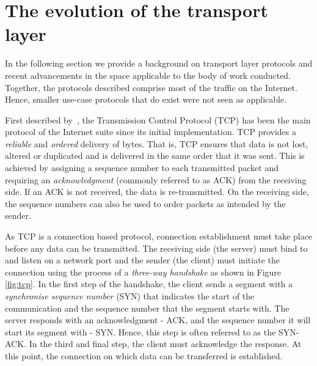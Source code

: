 \section{The evolution of the transport layer}

In the following section we provide a background on transport layer protocols and recent advancements in the space applicable to the body of work conducted.
Together, the protocols described comprise most of the traffic on the Internet.
Hence, smaller use-case protocols that do exist were not seen as applicable.

First described by~\citet{cerf_protocol_1974}, the Transmission Control Protocol (TCP) has been the main protocol of the Internet suite since its initial implementation.
TCP provides a \textit{reliable} and \textit{ordered} delivery of bytes.
That is, TCP ensures that data is not lost, altered or duplicated and is delivered in the same order that it was sent.
This is achieved by assigning a sequence number to each transmitted packet and requiring an \textit{acknowledgment} (commonly referred to as ACK) from the receiving side.
If an ACK is not received, the data is re-transmitted.
On the receiving side, the sequence numbers can also be used to order packets as intended by the sender.

As TCP is a connection based protocol, connection establishment must take place before any data can be transmitted.
The receiving side (the server) must bind to and listen on a network port and the sender (the client) must initiate the connection using the process of a \textit{three-way handshake} as shown in Figure \ref{fig:tcp}.
In the first step of the handshake, the client sends a segment with a \textit{synchronise sequence number} (SYN) that indicates the start of the communication and the sequence number that the segment starts with.
The server responds with an acknowledgment - ACK, and the sequence number it will start its segment with - SYN.
Hence, this step is often referred to as the SYN-ACK.
In the third and final step, the client must acknowledge the response.
At this point, the connection on which data can be transferred is established.

